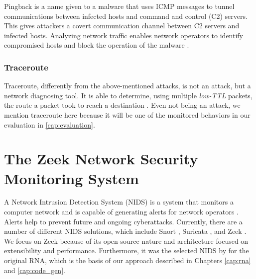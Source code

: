 Pingback is a name given to a malware that uses ICMP messages to tunnel communications between infected hosts and command and control (C2) servers. This gives attackers a covert communication channel between C2 servers and infected hosts. Analyzing network traffic enables network operators to identify compromised hosts and block the operation of the malware \cite{PingbackAttack}.

\subsubsection*{Traceroute}
\label{sec:bg:traceroute}

Traceroute, differently from the above-mentioned attacks, is not an attack, but a network diagnosing tool. It is able to determine, using multiple \textit{low-TTL} packets, the route a packet took to reach a destination \cite{Traceroute}. Even not being an attack, we mention traceroute here because it will be one of the monitored behaviors in our evaluation in \autoref{cap:evaluation}.






\section{The Zeek Network Security Monitoring System}
\label{sec:bg:zeek}

A Network Intrusion Detection System (NIDS) is a system that monitors a computer network and is capable of generating alerts for network operators \cite{NIDSScienceDirect}. Alerts help to prevent future and ongoing cyberattacks. Currently, there are a number of different NIDS solutions, which include Snort \cite{SnortWebsite}, Suricata \cite{SuricataWebsite}, and Zeek \cite{ZeekWebsite}. We focus on Zeek because of its open-source nature and architecture focused on extensibility and performance. Furthermore, it was the selected NIDS by  for the original RNA, which is the basis of our approach described in Chapters \ref{cap:rna} and \ref{cap:code_gen}.

